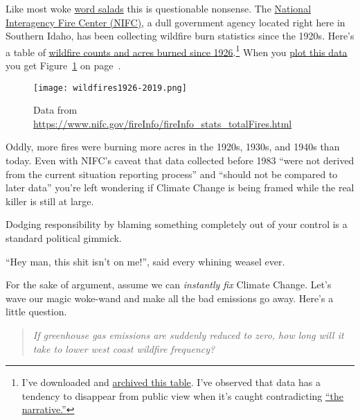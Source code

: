 Like most woke \href{https://www.dictionary.com/browse/word-salad}{word
salads} this is questionable nonsense. The
\href{https://www.nifc.gov/index.html}{National Interagency Fire Center
(NIFC)}, a dull government agency located right here in Southern Idaho,
has been collecting wildfire burn statistics since the 1920s. Here's a
table of
\href{https://www.nifc.gov/fireInfo/fireInfo_stats_totalFires.html}{wildfire
counts and acres burned since
1926}.\footnote{ I've downloaded and
  \href{https://github.com/bakerjd99/jacks/blob/master/notebooks/NationalFireData.txt}{archived
  this table}. I've observed that data has a tendency to disappear from
  public view when it's caught contradicting
  \href{https://www.urbandictionary.com/define.php?term=pushing\%20a\%20false\%20narrative}{``the
  narrative.''}
} When you %
\href{https://github.com/bakerjd99/jacks/blob/master/notebooks/wildfire\%20plot.ipynb}{plot
this data} you get Figure~\ref{fig:7007x0} on page~\pageref{fig:7007x0}.

\captionsetup[figure]{labelformat=default}
\begin{figure}[htbp]
\centering
\texttt{[image: wildfires1926-2019.png]}
\caption{Data from
\url{https://www.nifc.gov/fireInfo/fireInfo\_stats\_totalFires.html}}
\label{fig:7007x0}
\end{figure}

Oddly, more fires were burning more acres in the 1920s, 1930s, and 1940s
than today. Even with NIFC's caveat that data collected before 1983
``were not derived from the current situation reporting process'' and
``should not be compared to later data'' you're left wondering if
Climate Change is being framed while the real killer is still at large.

Dodging responsibility by blaming something completely out of your
control is a standard political gimmick.

``Hey man, this shit isn't on me!'', said every whining weasel ever.

For the sake of argument, assume we can \emph{instantly fix} Climate
Change. Let's wave our magic woke-wand and make all the bad emissions
go away. Here's a little question.

\begin{quote}
\emph{If greenhouse gas emissions are suddenly reduced to zero, how long
will it take to lower west coast wildfire frequency?}
\end{quote}

